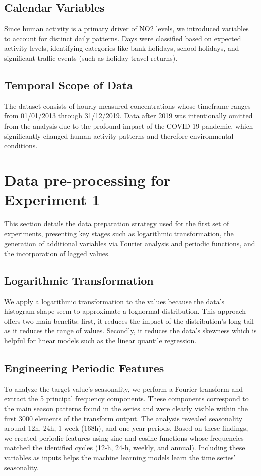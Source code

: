\documentclass[12pt,a4paper]{book}
\begin{document}
\subsection{Calendar Variables}
Since human activity is a primary driver of NO2 levels, we introduced variables to account for distinct daily patterns. Days were classified based on expected activity levels, identifying categories like bank holidays, school holidays, and significant traffic events (such as holiday travel returns). 

\subsection{Temporal Scope of Data}
The dataset consists of hourly measured concentrations whose timeframe ranges from 01/01/2013 through 31/12/2019. Data after 2019 was intentionally omitted from the analysis due to the profound impact of the COVID-19 pandemic, which significantly changed human activity patterns and therefore environmental conditions.

\section{Data pre-processing for Experiment 1}

This section details the data preparation strategy used for the first set of experiments, presenting key stages such as logarithmic transformation, the generation of additional variables via Fourier analysis and periodic functions, and the incorporation of lagged values. 

\subsection{Logarithmic Transformation}
We apply a logarithmic transformation to the values because the data's histogram shape seem to approximate a lognormal distribution. This approach offers two main benefits: first, it reduces the impact of the distribution's long tail as it reduces the range of values. Secondly, it reduces the data's skewness which is helpful for linear models such as the linear quantile regression.

\subsection{Engineering Periodic Features}
To analyze the target value's seasonality, we perform a Fourier transform and extract the 5 principal frequency components. These components correspond to the main season patterns found in the series and were clearly visible within the first 3000 elements of the transform output. The analysis revealed seasonality around 12h, 24h, 1 week (168h), and one year periods.
Based on these findings, we created periodic features using sine and cosine functions whose frequencies matched the identified cycles (12-h, 24-h, weekly, and annual). Including these variables as inputs helps the machine learning models learn the time series' seasonality.
\end{document}
